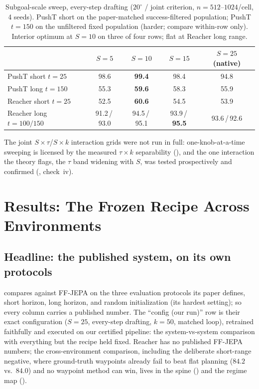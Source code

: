 \documentclass{article}
\newcommand{\ours}[1]{\textbf{#1}}
\newcommand{\degc}[1]{$#1^\circ$}
\begin{document}
\begin{table}[h]
\centering
\small
\caption{Subgoal-scale sweep, every-step drafting (\degc{20} / joint criterion,
$n{=}512$--$1024$/cell, 4 seeds). PushT short on the paper-matched success-filtered
population; PushT $t{=}150$ on the unfiltered fixed population (harder; compare
within-row only). Interior optimum at $S{=}10$ on three of four rows; flat at Reacher
long range.}
\label{tab:scurve}
\begin{tabular}{lcccc}
\toprule
& $S{=}5$ & $S{=}10$ & $S{=}15$ & $S{=}25$ (native) \\
\midrule
PushT short $t{=}25$        & 98.6 & \ours{99.4} & 98.4 & 94.8 \\
PushT long $t{=}150$        & 55.3 & \ours{59.6} & 58.3 & 55.9 \\
Reacher short $t{=}25$      & 52.5 & \ours{60.6} & 54.5 & 53.9 \\
Reacher long $t{=}100/150$  & 91.2\,/\,93.0 & 94.5\,/\,95.1 & 93.9\,/\,\ours{95.5} & 93.6\,/\,92.6 \\
\bottomrule
\end{tabular}
\end{table}

The joint $S{\times}\tau$/$S{\times}k$ interaction grids were not run in full:
one-knob-at-a-time sweeping is licensed by the measured $\tau{\times}k$ separability
(), and the one interaction the theory flags, the
$\tau$ band widening with $S$, was tested prospectively and confirmed
(, check~iv).

\section{Results: The Frozen Recipe Across Environments}
\label{sec:results}

\subsection{Headline: the published system, on its own protocols}
\label{sec:results-headline}

 compares against FF-JEPA on the three evaluation protocols its
paper defines, short horizon, long horizon, and random initialization (its
hardest setting); so every column carries a published number. The ``config (our
run)'' row is their exact configuration ($S{=}25$, every-step drafting, $k{=}50$,
matched loop), retrained faithfully and executed on our certified pipeline: the
system-vs-system comparison with everything but the recipe held fixed. Reacher has
no published FF-JEPA numbers; the cross-environment comparison, including the
deliberate short-range negative, where ground-truth waypoints already fail to beat
flat planning ($84.2$ vs.\ $84.0$) and no waypoint method can win, lives in the
spine () and the regime map ().
\end{document}
